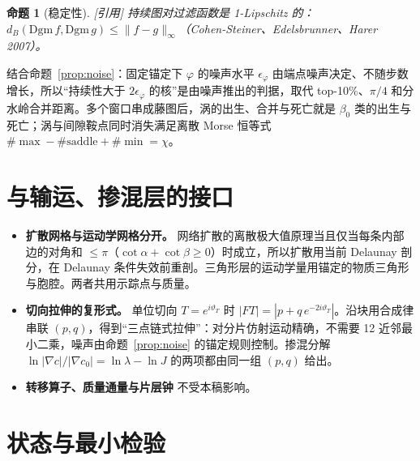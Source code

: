 \documentclass[10.5pt,a4paper]{article}
\newcommand{\keyp}[1]{\textbf{\sffamily #1}}
\theoremstyle{definition}
\theoremstyle{plain}
\newtheorem{proposition}[definition]{命题}
\theoremstyle{remark}
\newcommand{\status}[1]{\hfill{\small\color{accent}\textsf{[#1]}}}
\begin{document}
\begin{proposition}[稳定性]\status{引用}
持续图对过滤函数是 1-Lipschitz 的：$d_B(\mathrm{Dgm}\,f,\mathrm{Dgm}\,g)\le\|f-g\|_\infty$（Cohen-Steiner、Edelsbrunner、Harer 2007）。
\end{proposition}

结合命题~\ref{prop:noise}：固定锚定下 $\varphi$ 的噪声水平 $\epsilon_\varphi$ 由端点噪声决定、不随步数增长，所以“持续性大于 $2\epsilon_\varphi$ 的核”是由噪声推出的判据，取代 top-10\%、$\pi/4$ 和分水岭合并距离。多个窗口串成藤图后，涡的出生、合并与死亡就是 $\beta_0$ 类的出生与死亡；涡与间隙鞍点同时消失满足离散 Morse 恒等式 $\#\max-\#\mathrm{saddle}+\#\min=\chi$。

\section{与输运、掺混层的接口}

\begin{itemize}
\item \keyp{扩散网格与运动学网格分开。} 网络扩散的离散极大值原理当且仅当每条内部边的对角和 $\le\pi$（$\cot\alpha+\cot\beta\ge0$）时成立，所以扩散用当前 Delaunay 剖分，在 Delaunay 条件失效前重剖。三角形层的运动学量用锚定的物质三角形与胞腔。两者共用示踪点与质量。
\item \keyp{切向拉伸的复形式。} 单位切向 $T=e^{i\vartheta_T}$ 时 $|FT|=|p+q\,e^{-2i\vartheta_T}|$。沿块用合成律串联 $(p,q)$，得到“三点链式拉伸”：对分片仿射运动精确，不需要 12 近邻最小二乘，噪声由命题~\ref{prop:noise} 的锚定规则控制。掺混分解 $\ln|\nabla c|/|\nabla c_0|=\ln\lambda-\ln J$ 的两项都由同一组 $(p,q)$ 给出。
\item \keyp{转移算子、质量通量与片层钟} 不受本稿影响。
\end{itemize}

\section{状态与最小检验}
\end{document}
